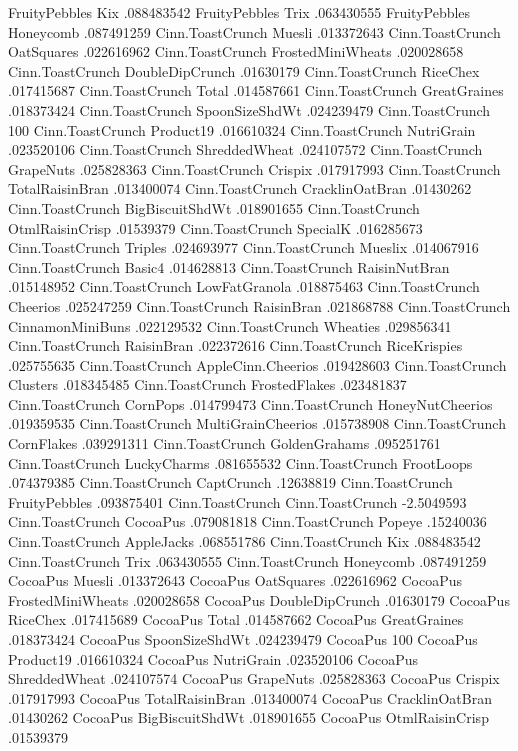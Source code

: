FruityPebbles	Kix	.088483542
FruityPebbles	Trix	.063430555
FruityPebbles	Honeycomb	.087491259
Cinn.ToastCrunch	Muesli	.013372643
Cinn.ToastCrunch	OatSquares	.022616962
Cinn.ToastCrunch	FrostedMiniWheats	.020028658
Cinn.ToastCrunch	DoubleDipCrunch	.01630179
Cinn.ToastCrunch	RiceChex	.017415687
Cinn.ToastCrunch	Total	.014587661
Cinn.ToastCrunch	GreatGraines	.018373424
Cinn.ToastCrunch	SpoonSizeShdWt	.024239479
Cinn.ToastCrunch	100%
Cinn.ToastCrunch	Product19	.016610324
Cinn.ToastCrunch	NutriGrain	.023520106
Cinn.ToastCrunch	ShreddedWheat	.024107572
Cinn.ToastCrunch	GrapeNuts	.025828363
Cinn.ToastCrunch	Crispix	.017917993
Cinn.ToastCrunch	TotalRaisinBran	.013400074
Cinn.ToastCrunch	CracklinOatBran	.01430262
Cinn.ToastCrunch	BigBiscuitShdWt	.018901655
Cinn.ToastCrunch	OtmlRaisinCrisp	.01539379
Cinn.ToastCrunch	SpecialK	.016285673
Cinn.ToastCrunch	Triples	.024693977
Cinn.ToastCrunch	Mueslix	.014067916
Cinn.ToastCrunch	Basic4	.014628813
Cinn.ToastCrunch	RaisinNutBran	.015148952
Cinn.ToastCrunch	LowFatGranola	.018875463
Cinn.ToastCrunch	Cheerios	.025247259
Cinn.ToastCrunch	RaisinBran	.021868788
Cinn.ToastCrunch	CinnamonMiniBuns	.022129532
Cinn.ToastCrunch	Wheaties	.029856341
Cinn.ToastCrunch	RaisinBran	.022372616
Cinn.ToastCrunch	RiceKrispies	.025755635
Cinn.ToastCrunch	AppleCinn.Cheerios	.019428603
Cinn.ToastCrunch	Clusters	.018345485
Cinn.ToastCrunch	FrostedFlakes	.023481837
Cinn.ToastCrunch	CornPops	.014799473
Cinn.ToastCrunch	HoneyNutCheerios	.019359535
Cinn.ToastCrunch	MultiGrainCheerios	.015738908
Cinn.ToastCrunch	CornFlakes	.039291311
Cinn.ToastCrunch	GoldenGrahams	.095251761
Cinn.ToastCrunch	LuckyCharms	.081655532
Cinn.ToastCrunch	FrootLoops	.074379385
Cinn.ToastCrunch	CaptCrunch	.12638819
Cinn.ToastCrunch	FruityPebbles	.093875401
Cinn.ToastCrunch	Cinn.ToastCrunch	-2.5049593
Cinn.ToastCrunch	CocoaPus	.079081818
Cinn.ToastCrunch	Popeye	.15240036
Cinn.ToastCrunch	AppleJacks	.068551786
Cinn.ToastCrunch	Kix	.088483542
Cinn.ToastCrunch	Trix	.063430555
Cinn.ToastCrunch	Honeycomb	.087491259
CocoaPus	Muesli	.013372643
CocoaPus	OatSquares	.022616962
CocoaPus	FrostedMiniWheats	.020028658
CocoaPus	DoubleDipCrunch	.01630179
CocoaPus	RiceChex	.017415689
CocoaPus	Total	.014587662
CocoaPus	GreatGraines	.018373424
CocoaPus	SpoonSizeShdWt	.024239479
CocoaPus	100%
CocoaPus	Product19	.016610324
CocoaPus	NutriGrain	.023520106
CocoaPus	ShreddedWheat	.024107574
CocoaPus	GrapeNuts	.025828363
CocoaPus	Crispix	.017917993
CocoaPus	TotalRaisinBran	.013400074
CocoaPus	CracklinOatBran	.01430262
CocoaPus	BigBiscuitShdWt	.018901655
CocoaPus	OtmlRaisinCrisp	.01539379
